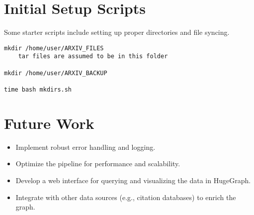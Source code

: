 \documentclass{article}
\begin{document}
\section{Initial Setup Scripts}
Some starter scripts include setting up proper directories and file syncing.
\begin{lstlisting}
mkdir /home/user/ARXIV_FILES
	tar files are assumed to be in this folder

mkdir /home/user/ARXIV_BACKUP

time bash mkdirs.sh 
\end{lstlisting}

\section{Future Work}

\begin{itemize}
    \item Implement robust error handling and logging.
    \item Optimize the pipeline for performance and scalability.
    \item Develop a web interface for querying and visualizing the data in HugeGraph.
    \item Integrate with other data sources (e.g., citation databases) to enrich the graph.
\end{itemize}
\end{document}
